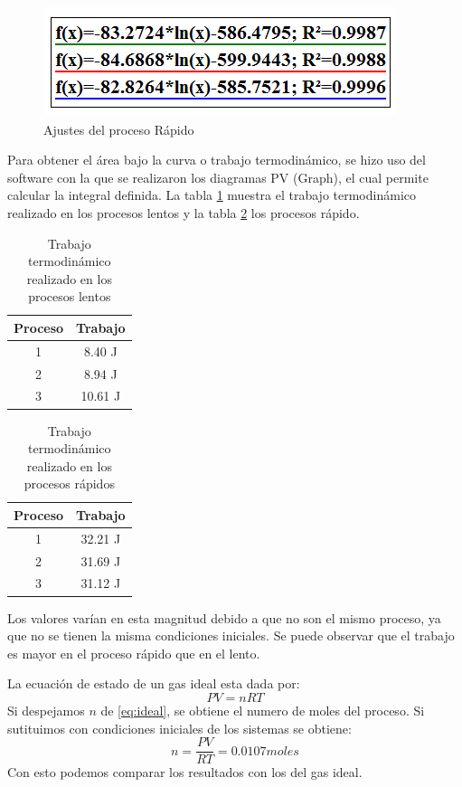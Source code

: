 \documentclass[12pt]{article}
\begin{document}
\begin{figure}[H]
\centering
\includegraphics[width=0.35\linewidth]{AAdiab.png}
\caption{Ajustes del proceso Rápido}
\label{fig:aadb}
\end{figure}

Para obtener el área bajo la curva o trabajo termodinámico, se hizo uso del software con la que se realizaron los diagramas PV (Graph), el cual permite calcular la integral definida. La tabla \ref{tab:traIso} muestra el trabajo termodinámico realizado en los procesos lentos y la tabla \ref{tab:traAdb} los procesos rápido.

\begin{table}[H]
\centering
\begin{tabular}{|c|c|}
\hline
Proceso & Trabajo \\ \hline
1 & 8.40 J \\ \hline
2 & 8.94 J \\ \hline
3 & 10.61 J \\ \hline
\end{tabular}
\caption{Trabajo termodinámico realizado en los procesos lentos}
\label{tab:traIso}
\end{table}

\begin{table}[H]
\centering
\begin{tabular}{|c|c|}
\hline
Proceso & Trabajo \\ \hline
1 & 32.21 J \\ \hline
2 & 31.69 J \\ \hline
3 & 31.12 J \\ \hline
\end{tabular}
\caption{Trabajo termodinámico realizado en los procesos rápidos}
\label{tab:traAdb}
\end{table}
Los valores varían en esta magnitud debido a que no son el mismo proceso, ya que no se tienen la misma condiciones iniciales. Se puede observar que el trabajo es mayor en el proceso rápido que en el lento.

La ecuación de estado de un gas ideal esta dada por:
\begin{equation} \label{eq:ideal}
PV=nRT
\end{equation}
Si despejamos $n$ de \eqref{eq:ideal}, se obtiene el numero de moles del proceso. Si sutituimos con condiciones iniciales de los sistemas se obtiene:
$$n = \frac{PV}{RT} = 0.0107 moles$$
Con esto podemos comparar los resultados con los del gas ideal.
\end{document}
